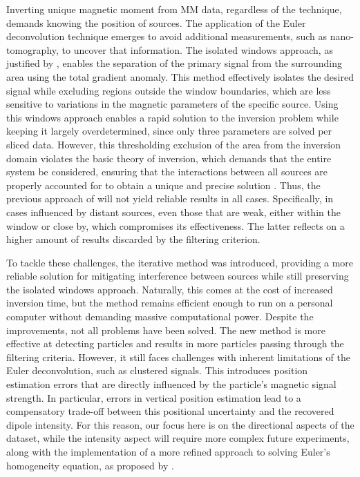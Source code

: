 Inverting unique magnetic moment from MM data, regardless of the technique, demands knowing the position of sources. The application of the Euler deconvolution technique emerges to avoid additional measurements, such as nano-tomography, to uncover that information. The isolated windows approach, as justified by \cite{Souza-Junior2024}, enables the separation of the primary signal from the surrounding area using the total gradient anomaly. This method effectively isolates the desired signal while excluding regions outside the window boundaries, which are less sensitive to variations in the magnetic parameters of the specific source. Using this windows approach enables a rapid solution to the inversion problem while keeping it largely overdetermined, since only three parameters are solved per sliced data. However, this thresholding exclusion of the area from the inversion domain violates the basic theory of inversion, which demands that the entire system be considered, ensuring that the interactions between all sources are properly accounted for to obtain a unique and precise solution \citep{Baratchart2013, Lima2013}. Thus, the previous approach of \cite{Souza-Junior2024} will not yield reliable results in all cases. Specifically, in cases influenced by distant sources, even those that are weak, either within the window or close by, which compromises its effectiveness. The latter reflects on a higher amount of results discarded by the filtering criterion.

To tackle these challenges, the iterative method was introduced, providing a more reliable solution for mitigating interference between sources while still preserving the isolated windows approach. Naturally, this comes at the cost of increased inversion time, but the method remains efficient enough to run on a personal computer without demanding massive computational power. Despite the improvements, not all problems have been solved. The new method is more effective at detecting particles and results in more particles passing through the filtering criteria. However, it still faces challenges with inherent limitations of the Euler deconvolution, such as clustered signals. This introduces position estimation errors that are directly influenced by the particle's magnetic signal strength. In particular, errors in vertical position estimation lead to a compensatory trade-off between this positional uncertainty and the recovered dipole intensity. For this reason, our focus here is on the directional aspects of the dataset, while the intensity aspect will require more complex future experiments, along with the implementation of a more refined approach to solving Euler's homogeneity equation, as proposed by \citet{Uieda2025}.

